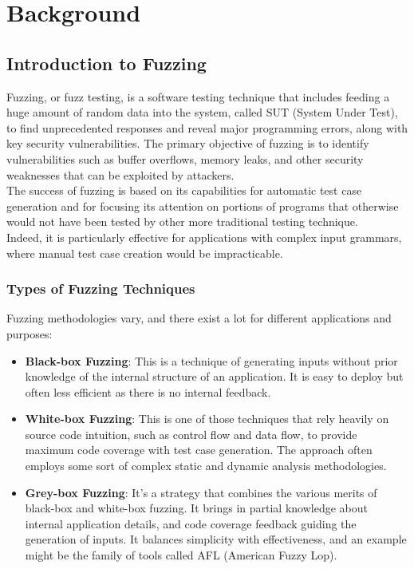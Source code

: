 \chapter{Background}

\section{Introduction to Fuzzing}

Fuzzing, or fuzz testing, is a software testing technique that includes feeding a huge amount of random data into the system, called SUT (System Under Test), to find unprecedented responses and reveal major programming errors, along with key security vulnerabilities. The primary objective of fuzzing is to identify vulnerabilities such as buffer overflows, memory leaks, and other security weaknesses that can be exploited by attackers.
\\The success of fuzzing is based on its capabilities for automatic test case generation and for focusing its attention on portions of programs that otherwise would not have been tested by other more traditional testing technique.
\\Indeed, it is particularly effective for applications with complex input grammars, where manual test case creation would be impracticable.

\subsection{Types of Fuzzing Techniques}
Fuzzing methodologies vary, and there exist a lot for different applications and purposes:

\begin{itemize}
    \item \textbf{Black-box Fuzzing}: This is a technique of generating inputs without prior knowledge of the internal structure of an application. It is easy to deploy but often less efficient as there is no internal feedback.
    
    \item \textbf{White-box Fuzzing}: This is one of those techniques that rely heavily on source code intuition, such as control flow and data flow, to provide maximum code coverage with test case generation. The approach often employs some sort of complex static and dynamic analysis methodologies.
    
    \item \textbf{Grey-box Fuzzing}: It's a strategy that combines the various merits of black-box and white-box fuzzing. It brings in partial knowledge about internal application details, and code coverage feedback guiding the generation of inputs. It balances simplicity with effectiveness, and an example might be the family of tools called AFL (American Fuzzy Lop).
\end{itemize}

